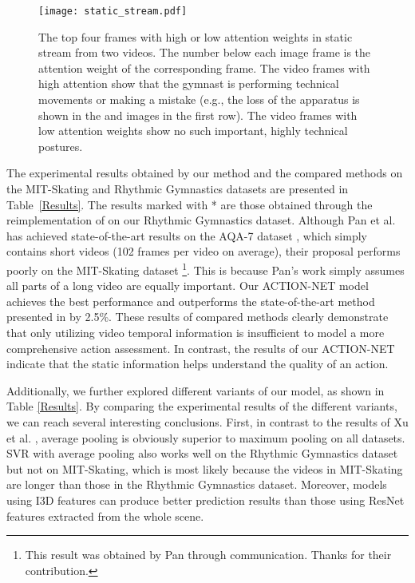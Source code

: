 \documentclass[sigconf]{acmart}
\begin{document}
\begin{figure*}[htb]
 \centering
 \texttt{[image: static\_stream.pdf]}
 \vspace{-0.3cm}
\caption{The top four frames with high or low attention weights in static stream from two videos. The number below each image frame is the attention weight of the corresponding frame. The video frames with high attention show that the gymnast is performing technical movements or making a mistake (e.g., the loss of the apparatus is shown in the  and  images in the first row). The video frames with low attention weights show no such important, highly technical postures.}
\vspace{-0.3cm}
 \label{fig:static stream}
\end{figure*}


The experimental results obtained by our method and the compared methods on the MIT-Skating and Rhythmic Gymnastics datasets are presented in Table~\ref{Results}. The results marked with * are those obtained through the reimplementation of \cite{parmar2017learning,xu2019learning} on our Rhythmic Gymnastics dataset. Although Pan et al. \cite{pan2019action} has achieved state-of-the-art results on the AQA-7 dataset \cite{parmar2019action}, which simply contains short videos (102 frames per video on average), their proposal performs poorly on the MIT-Skating dataset \footnote{This result was obtained by Pan through communication. Thanks for their contribution.}. This is because Pan's work simply assumes all parts of a long video are equally important. Our ACTION-NET model achieves the best performance and outperforms the state-of-the-art method presented in \cite{xu2019learning} by 2.5\%. These results of compared methods clearly demonstrate that only utilizing video temporal information is insufficient to model a more comprehensive action assessment. In contrast, the results of our ACTION-NET indicate that the static information helps understand the quality of an action.

Additionally, we further explored different variants of our model, as shown in Table \ref{Results}. By comparing the experimental results of the different variants, we can reach several interesting conclusions. First, in contrast to the results of Xu et al. \cite{xu2019learning}, average pooling is obviously superior to maximum pooling on all datasets.
SVR with average pooling also works well on the Rhythmic Gymnastics dataset but not on MIT-Skating, which is most likely because the videos in MIT-Skating are longer than those in the Rhythmic Gymnastics dataset. Moreover, models using I3D features can produce better prediction results than those using ResNet features extracted from the whole scene.
\end{document}
